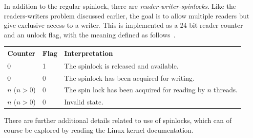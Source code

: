 In addition to the regular spinlock, there are \textit{reader-writer-spinlocks}. Like the readers-writers problem discussed earlier, the goal is to allow multiple readers but give exclusive access to a writer. This is implemented as a 24-bit reader counter and an unlock flag, with the meaning defined as follows~\cite{osi}.

\begin{center}
\begin{tabular}{l|l|l}
	\textbf{Counter} & \textbf{Flag} & \textbf{Interpretation}\\\hline
	0 & 1 & The spinlock is released and available. \\
	0 & 0 & The spinlock has been acquired for writing.\\
	$n$ ($n > 0$) & 0 & The spin lock has been acquired for reading by $n$ threads.\\
	$n$ ($n > 0$) & 0 & Invalid state.\\
\end{tabular}
\end{center}

There are further additional details related to use of spinlocks, which can of course be explored by reading the Linux kernel documentation.




